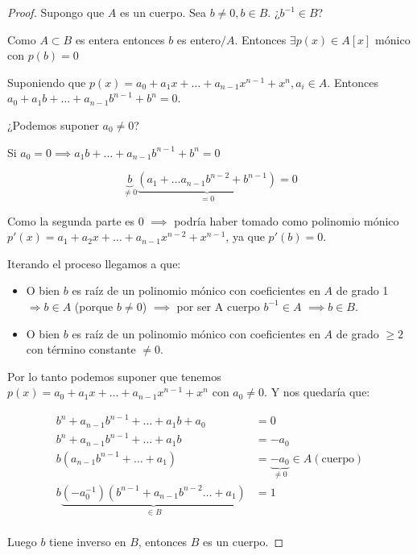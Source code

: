 	\begin{proof}

		\proofpart{$\Rightarrow$}

		Supongo que $A$ es un cuerpo. Sea $b \neq 0, b \in B$. ¿$b^{-1} \in B$?

		Como $A \subset B$ es entera entonces $b$ es entero$/A$. Entonces $\exists p(x) \in A[x]$ mónico con $p(b)=0$

		Suponiendo que $p(x)=a_0 + a_1x + … + a_{n-1}x^{n-1} + x^n, a_i \in A$. Entonces $a_0 + a_1 b + … + a_{n-1}b^{n-1} + b^n = 0$.

		¿Podemos suponer $a_0 \neq 0$?

		Si $a_0 = 0 \implies  a_1 b + … + a_{n-1}b^{n-1}+b^{n} = 0$

		\[ \underbrace{b}_{\neq 0} \underbrace{(a_1 + … a_{n-1}b^{n-2} + b^{n-1})}_{=0} = 0\]

		Como la segunda parte es 0 $\implies$ podría haber tomado como polinomio mónico $p'(x) = a_1 + a_2 x + … + a_{n-1}x^{n-2} + x^{n-1}$, ya que $p'(b)=0$.

		Iterando el proceso llegamos a que:

		\begin{itemize}
			\item O bien $b$ es raíz de un polinomio mónico con coeficientes en $A$ de grado 1 $\Rightarrow b \in A$ (porque $b \neq 0$) $\implies$ por ser A cuerpo $b^{-1} \in A$  $\implies b \in B$.

			\item O bien $b$ es raíz de un polinomio mónico con coeficientes en $A$ de grado $\geq 2$ con término constante $\neq 0$.

		\end{itemize}

		Por lo tanto podemos suponer que tenemos $p(x) = a_0 + a_1x + … + a_{n-1}x^{n-1} + x^n$ con $a_0 \neq 0$. Y nos quedaría que:

		\begin{align*}
		b^n + a_{n-1}b^{n-1}+…+a_1b + a_0 &= 0 \\
		b^n + a_{n-1}b^{n-1}+…+a_1b &= -a_0 \\
		b(a_{n-1}b^{n-1}+…+a_1) &= \underbrace{-a_0}_{\neq 0} \in A (\text{cuerpo}) \\
		b \underbrace{(-a_0^{-1})(b^{n-1}+a_{n-1}b^{n-2}…+a_1)}_{\in B} &= 1 \\
		\end{align*}

		Luego $b$ tiene inverso en $B$, entonces $B$ es un cuerpo.


\end{proof}
